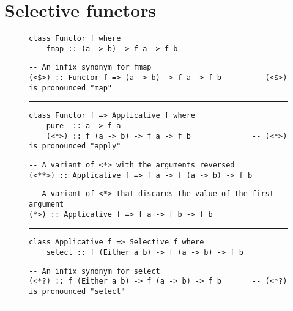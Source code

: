\section{Selective functors}\label{sec-selective}

\begin{figure}
\begin{verbatim}
class Functor f where
    fmap :: (a -> b) -> f a -> f b
\end{verbatim}
\vspace{0.5mm}
\begin{verbatim}
-- An infix synonym for fmap
(<$>) :: Functor f => (a -> b) -> f a -> f b       -- (<$>) is pronounced "map"
\end{verbatim}
\vspace{2mm}
\hrule
\vspace{2mm}
\begin{verbatim}
class Functor f => Applicative f where
    pure  :: a -> f a
    (<*>) :: f (a -> b) -> f a -> f b              -- (<*>) is pronounced "apply"
\end{verbatim}
\vspace{0.5mm}
\begin{verbatim}
-- A variant of <*> with the arguments reversed
(<**>) :: Applicative f => f a -> f (a -> b) -> f b
\end{verbatim}
\vspace{0.5mm}
\begin{verbatim}
-- A variant of <*> that discards the value of the first argument
(*>) :: Applicative f => f a -> f b -> f b
\end{verbatim}
\vspace{2mm}
\hrule
\vspace{2mm}
\begin{verbatim}
class Applicative f => Selective f where
    select :: f (Either a b) -> f (a -> b) -> f b
\end{verbatim}
\vspace{0.5mm}
\begin{verbatim}
-- An infix synonym for select
(<*?) :: f (Either a b) -> f (a -> b) -> f b       -- (<*?) is pronounced "select"
\end{verbatim}
\vspace{2mm}
\hrule
\vspace{2mm}
\begin{verbatim}

\end{verbatim}
\end{figure}
